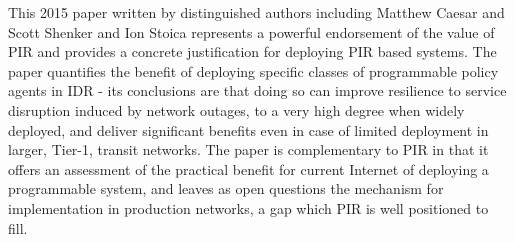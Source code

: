 This 2015 paper \cite{Godfrey2015a} written by distinguished authors including Matthew Caesar and Scott Shenker and Ion Stoica
represents a powerful endorsement of the value of PIR and provides a concrete justification for deploying PIR based systems.
The paper quantifies the benefit of deploying
specific classes of programmable policy agents in IDR - its conclusions are
that doing so can improve resilience to service disruption induced by network
outages, to a very high degree when widely deployed, and deliver significant
benefits even in case of limited deployment in larger, Tier-1, transit networks.
The paper is complementary to PIR in that it offers an assessment of
the practical benefit for current Internet of deploying a programmable system,
and leaves as open questions the mechanism for implementation in production
networks, a gap which PIR is well positioned to fill.







